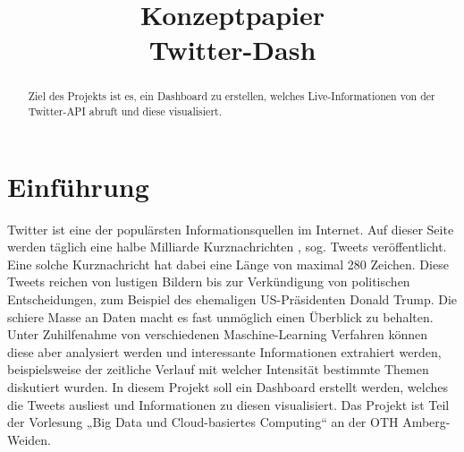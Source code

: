 \documentclass[conference]{IEEEtran}
\begin{document}
\title{Konzeptpapier\\Twitter-Dash}

\author{
        \and

        \and

        \and

        \and

        \and

}

\maketitle

\begin{abstract}
        Ziel des Projekts ist es, ein Dashboard zu erstellen, welches Live-Informationen von der Twitter-API abruft und diese visualisiert.
\end{abstract}


\section{Einführung}

Twitter ist eine der populärsten Informationsquellen im Internet.
Auf dieser Seite werden täglich eine halbe Milliarde Kurznachrichten \cite{Tweetstatistiken}, sog. Tweets veröffentlicht.
Eine solche Kurznachricht hat dabei eine Länge von maximal 280 Zeichen.
Diese Tweets reichen von lustigen Bildern bis zur Verkündigung von politischen Entscheidungen, zum Beispiel des ehemaligen US-Präsidenten Donald Trump.
Die schiere Masse an Daten macht es fast unmöglich einen Überblick zu behalten.
Unter Zuhilfenahme von verschiedenen Maschine-Learning Verfahren können diese aber analysiert werden und interessante Informationen extrahiert werden, beispielsweise der zeitliche Verlauf mit welcher Intensität bestimmte Themen diskutiert wurden.
In diesem Projekt soll ein Dashboard erstellt werden, welches die Tweets ausliest und Informationen zu diesen visualisiert.
Das Projekt ist Teil der Vorlesung „Big Data und Cloud-basiertes Computing“ an der OTH Amberg-Weiden.
\end{document}
